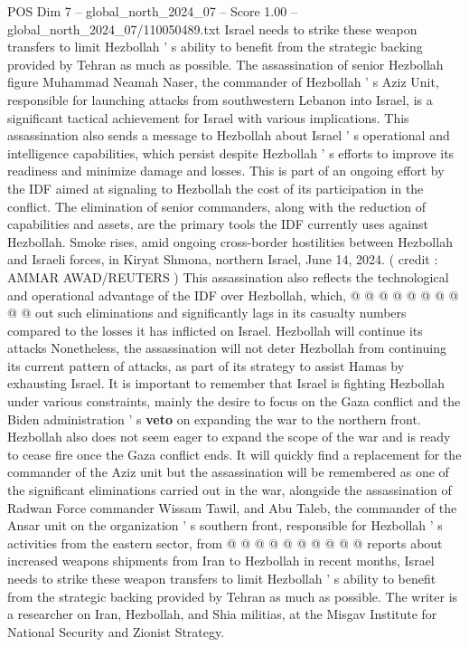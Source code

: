 \begin{textsample}{POS Dim 7 – global\_north\_2024\_07 – Score 1.00 – global\_north\_2024\_07/110050489.txt}  \label{ex:f7_pos_337}
Israel needs to strike these weapon transfers to limit Hezbollah ' s ability to benefit from the strategic backing provided by Tehran as much as possible.
The assassination of senior Hezbollah figure Muhammad Neamah Naser, the commander of Hezbollah ' s Aziz Unit, responsible for launching attacks from southwestern Lebanon into Israel, is a significant tactical achievement for Israel with various implications.
This assassination also sends a message to Hezbollah about Israel ' s operational and intelligence capabilities, which persist despite Hezbollah ' s efforts to improve its readiness and minimize damage and losses.
This is part of an ongoing effort by the IDF aimed at signaling to Hezbollah the cost of its participation in the conflict.
The elimination of senior commanders, along with the reduction of capabilities and assets, are the primary tools the IDF currently uses against Hezbollah.
Smoke rises, amid ongoing cross-border hostilities between Hezbollah and Israeli forces, in Kiryat Shmona, northern Israel, June 14, 2024. ( credit : AMMAR AWAD/REUTERS ) This assassination also reflects the technological and operational advantage of the IDF over Hezbollah, which, @ @ @ @ @ @ @ @ @ @ out such eliminations and significantly lags in its casualty numbers compared to the losses it has inflicted on Israel.
Hezbollah will continue its attacks Nonetheless, the assassination will not deter Hezbollah from continuing its current pattern of attacks, as part of its strategy to assist Hamas by exhausting Israel.
It is important to remember that Israel is fighting Hezbollah under various constraints, mainly the desire to focus on the Gaza conflict and the Biden administration ' s \textbf{veto} on expanding the war to the northern front.
Hezbollah also does not seem eager to expand the scope of the war and is ready to cease fire once the Gaza conflict ends.
It will quickly find a replacement for the commander of the Aziz unit but the assassination will be remembered as one of the significant eliminations carried out in the war, alongside the assassination of Radwan Force commander Wissam Tawil, and Abu Taleb, the commander of the Ansar unit on the organization ' s southern front, responsible for Hezbollah ' s activities from the eastern sector, from @ @ @ @ @ @ @ @ @ @ reports about increased weapons shipments from Iran to Hezbollah in recent months, Israel needs to strike these weapon transfers to limit Hezbollah ' s ability to benefit from the strategic backing provided by Tehran as much as possible.
The writer is a researcher on Iran, Hezbollah, and Shia militias, at the Misgav Institute for National Security and Zionist Strategy.

\end{textsample}
